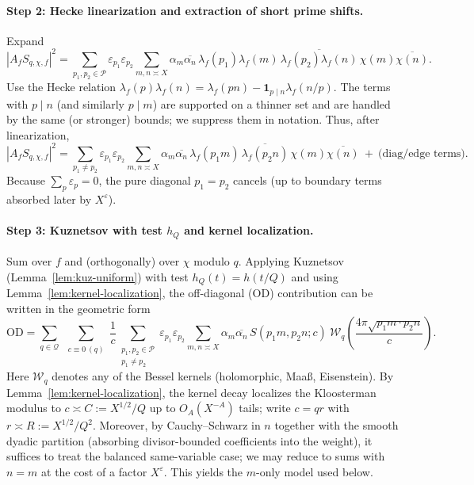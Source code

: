 \documentclass[11pt]{article}
\theoremstyle{definition}
\theoremstyle{remark}
\begin{document}
\paragraph{Step 2: Hecke linearization and extraction of short prime shifts.}
Expand
\[
	|A_f S_{q,\chi,f}|^2
	=\sum_{p_1,p_2\in\mathcal P}\varepsilon_{p_1}\varepsilon_{p_2}
	\sum_{m,n\asymp X}\alpha_m\overline{\alpha_n}\,
	\lambda_f(p_1)\lambda_f(m)\,\overline{\lambda_f(p_2)\lambda_f(n)}\,\chi(m)\overline{\chi(n)}.
\]
Use the Hecke relation $\lambda_f(p)\lambda_f(n)=\lambda_f(pn)-\mathbf 1_{p\mid n}\lambda_f(n/p)$.
The terms with $p\mid n$ (and similarly $p\mid m$) are supported on a thinner set and are handled by the same (or stronger) bounds; we suppress them in notation.
Thus, after linearization,
\[
	|A_f S_{q,\chi,f}|^2
	= \sum_{p_1\ne p_2}\varepsilon_{p_1}\varepsilon_{p_2}
	\!\!\sum_{m,n\asymp X}\!\alpha_m\overline{\alpha_n}\,
	\lambda_f(p_1 m)\,\overline{\lambda_f(p_2 n)}\,\chi(m)\overline{\chi(n)}
	\ +\ \text{(diag/edge terms)}.
\]
Because $\sum_{p}\varepsilon_p=0$, the pure diagonal $p_1=p_2$ cancels (up to boundary terms absorbed later by $X^\varepsilon$).

\paragraph{Step 3: Kuznetsov with test $h_Q$ and kernel localization.}
Sum over $f$ and (orthogonally) over $\chi$ modulo $q$.
Applying Kuznetsov (Lemma~\ref{lem:kuz-uniform}) with test $h_Q(t)=h(t/Q)$ and using Lemma~\ref{lem:kernel-localization},
the off-diagonal (OD) contribution can be written in the geometric form
\[
	\mathrm{OD}
	=\sum_{q\in\mathcal Q}\ \sum_{\substack{c\equiv 0\ (q)}} \frac{1}{c}
	\sum_{\substack{p_1,p_2\in\mathcal P\\ p_1\ne p_2}}\varepsilon_{p_1}\varepsilon_{p_2}
	\sum_{m,n\asymp X}\alpha_m\overline{\alpha_n}\,
	S(p_1 m, p_2 n;c)\ \mathcal W_q\!\left(\frac{4\pi\sqrt{p_1 m\cdot p_2 n}}{c}\right).
\]
Here $\mathcal W_q$ denotes any of the Bessel kernels (holomorphic, Maa\ss, Eisenstein).
By Lemma~\ref{lem:kernel-localization}, the kernel decay localizes the Kloosterman modulus to
$c\asymp C:=X^{1/2}/Q$ up to $O_A(X^{-A})$ tails; write $c=qr$ with $r\asymp R:=X^{1/2}/Q^2$.
Moreover, by Cauchy--Schwarz in $n$ together with the smooth dyadic partition (absorbing divisor-bounded coefficients into the weight), it suffices to treat the balanced same-variable case; we may reduce to sums with $n=m$ at the cost of a factor $X^{\varepsilon}$. This yields the $m$-only model used below.
\end{document}
